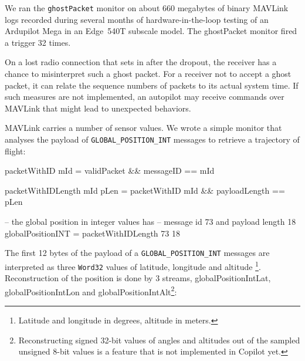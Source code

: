 We ran the {\tt ghostPacket} monitor on about 660 megabytes of
binary MAVLink logs recorded during several months of hardware-in-the-loop
testing of an Ardupilot Mega in an Edge~540T subscale model. %
The ghostPacket monitor fired a trigger 32 times.  

On a lost radio connection that sets in after the dropout, the receiver has a
chance to misinterpret such a ghost packet.  For a receiver not to accept a
ghost packet, it can relate the sequence numbers of packets to its actual system
time. If such measures are not implemented, an autopilot may receive commands
over MAVLink that might lead to unexpected behaviors.

MAVLink carries a number of sensor values. We wrote a simple monitor that
analyses the payload of {\tt GLOBAL\_POSITION\_INT} messages to retrieve a
trajectory of flight:

\begin{code}
packetWithID mId = validPacket && messageID == mId

packetWithIDLength mId pLen =
    packetWithID mId && payloadLength == pLen

-- the global position in integer values has 
-- message id 73  and payload length 18
globalPositionINT = packetWithIDLength 73 18
\end{code}

The first 12 bytes of the payload of a {\small \tt GLOBAL\_POSITION\_INT}
messages are interpreted as three {\tt Word32} values of latitude, longitude and
altitude
\footnote{Latitude and longitude in degrees, altitude in meters.}.
Reconstruction of the position is done by 3 streams, globalPositionIntLat,
globalPositionIntLon and globalPositionIntAlt\footnote{Reconstructing signed 32-bit values of angles and altitudes out of the sampled unsigned 8-bit values is a feature that is not implemented in Copilot yet.}:

